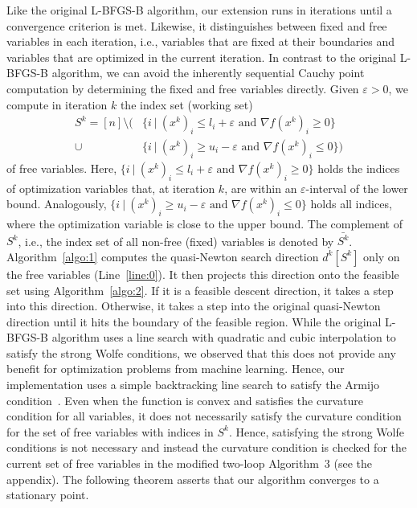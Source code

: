 \documentclass[letterpaper]{article} %
\newcommand{\vareps}{\varepsilon}
\begin{document}
Like the original  L-BFGS-B algorithm, our extension runs in iterations until a convergence criterion is met. Likewise, it distinguishes between fixed and free variables in each iteration, i.e., variables that are fixed at their boundaries and variables that are optimized in the current iteration. In contrast to the original L-BFGS-B algorithm, we can avoid the inherently sequential Cauchy point computation by determining the fixed and free variables directly. Given $\varepsilon >0$, we compute in iteration $k$ the index set (working set)
\begin{equation}
  \label{eq:ws}
\begin{aligned}
S^k = [n] \setminus \big ( & \big\{ i \ |\  (x^k)_i \leq l_i + \vareps \mbox{ and } \nabla f(x^k)_i \geq 0\big\} \\ 
\cup \, & \big\{ i \ |\  (x^k)_i \geq u_i - \vareps \mbox{ and } \nabla f(x^k)_i \leq 0\big\} \big )
\end{aligned}
\end{equation}
of free variables. Here, $\{i \ |\  (x^k)_i \leq l_i + \vareps \mbox{ and } \nabla f(x^k)_i \geq 0\}$ holds the indices of optimization variables that, at iteration $k$, are within an $\vareps$-interval of the lower bound. Analogously, $\{i \ |\  (x^k)_i \geq u_i - \vareps \mbox{ and } \nabla f(x^k)_i \leq 0\}$ holds all indices, where the optimization variable is close to the upper bound. The complement of $S^k$, i.e., the index set of all non-free (fixed) variables is denoted by $\bar{S^k}$. Algorithm~\ref{algo:1} computes the quasi-Newton search direction $d^k[S^k]$ only on the free variables (Line~\ref{line:0}). It then projects this direction onto the feasible set using Algorithm~\ref{algo:2}. If it is a feasible descent direction, it takes a step into this direction. Otherwise, it takes a step into the original quasi-Newton direction until it hits the boundary of the feasible region. While the original \mbox{L-BFGS-B} algorithm uses a line search with quadratic and cubic interpolation to satisfy the strong Wolfe conditions, we observed that this does not provide any benefit for optimization problems from machine learning. Hence, our implementation uses a simple backtracking line search to satisfy the Armijo condition~\cite{NocedalW99}. Even when the function is convex and satisfies the curvature condition for all variables, it does not necessarily satisfy the curvature condition for the set of free variables with indices in $S^k$. Hence, satisfying the strong Wolfe conditions is not necessary and instead the curvature condition is checked for the current set of free variables in the modified two-loop Algorithm~3 (see the appendix). The following theorem asserts that our algorithm converges to a stationary point.
\end{document}

